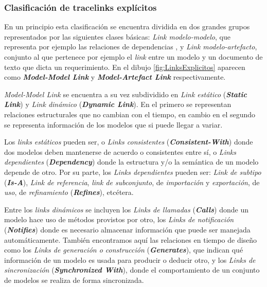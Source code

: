 \documentclass[a4paper,12pt,oneside,spanish]{book}
\begin{document}
\subsubsection{Clasificación de tracelinks explícitos}

En un principio esta clasificación se encuentra dividida en dos grandes grupos representados por las siguientes clases básicas: \textit{Link modelo-modelo}, que representa por ejemplo las relaciones de dependencias , y \textit{Link modelo-artefacto}, conjunto al que pertenece por ejemplo el \textit{link} entre un modelo y un documento de texto que dicta un requerimiento. En el dibujo \ref{fig:LinksExplicitos} aparecen como \textit{\textbf{Model-Model Link}} y \textit{\textbf{Model-Artefact Link}} respectivamente.

\textit{Model-Model Link} se encuentra a su vez subdividido en \textit{Link estático} (\textit{\textbf{Static Link}}) y \textit{Link dinámico} (\textit{\textbf{Dynamic Link}}). En el primero se representan relaciones estructurales que no cambian con el tiempo, en cambio en el segundo se representa información de los modelos que si puede llegar a variar.

Los \textit{links estáticos} pueden ser, o \textit{Links consistentes} (\textit{\textbf{Consistent-With}}) donde dos modelos deben mantenerse de acuerdo o consistentes entre sí, o \textit{Links dependientes} (\textit{\textbf{Dependency}}) donde la estructura y/o la semántica de un modelo depende de otro. Por su parte, los \textit{Links dependientes} pueden ser: \textit{Link de subtipo} (\textit{\textbf{Is-A}}), \textit{Link de referencia}, \textit{link de subconjunto}, de \textit{importación} y \textit{exportación}, de \textit{uso}, de \textit{refinamiento} (\textit{\textbf{Refines}}), etcétera.

Entre los \textit{links dinámicos} se incluyen los \textit{Links de llamadas} (\textit{\textbf{Calls}}) donde un modelo hace uso de métodos provistos por otro, los \textit{Links de notificación} (\textit{\textbf{Notifies}}) donde es necesario almacenar información que puede ser manejada automáticamente. También encontramos aquí las relaciones en tiempo de diseño como los \textit{Links de generación o construcción} (\textit{\textbf{Generates}}), que indican qué información de un modelo es usada para producir o deducir otro, y los \textit{Links de sincronización} (\textit{\textbf{Synchronized With}}), donde el comportamiento de un conjunto de modelos se realiza de forma sincronizada.
\end{document}
